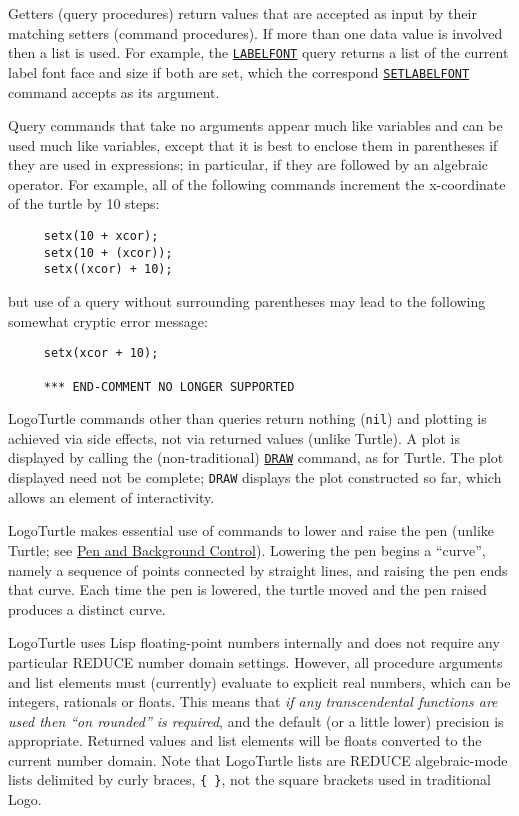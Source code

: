 Getters (query procedures) return values that are accepted as input by
their matching setters (command procedures).  If more than one data
value is involved then a list is used.  For example, the
\hyperref[logoturtle:labelfont]{\texttt{LABELFONT}} query returns a
list of the current label font face and size if both are set, which
the correspond
\hyperref[logoturtle:setlabelfont]{\texttt{SETLABELFONT}} command
accepts as its argument.

Query commands that take no arguments appear much like variables and
can be used much like variables, except that it is best to enclose
them in parentheses if they are used in expressions; in particular, if
they are followed by an algebraic operator.  For example, all of the
following commands increment the x-coordinate of the turtle by 10
steps:
\begin{verbatim}
     setx(10 + xcor);
     setx(10 + (xcor));
     setx((xcor) + 10);
\end{verbatim}
but use of a query without surrounding parentheses may lead to the
following somewhat cryptic error message:
\begin{verbatim}
     setx(xcor + 10);

     *** END-COMMENT NO LONGER SUPPORTED
\end{verbatim}

LogoTurtle commands other than queries return nothing (\texttt{nil})
and plotting is achieved via side effects, not via returned values
(unlike Turtle).  A plot is displayed by calling the (non-traditional)
\hyperref[logoturtle:draw]{\texttt{DRAW}} command, as for Turtle.  The
plot displayed need not be complete; \texttt{DRAW} displays the plot
constructed so far, which allows an element of interactivity.

LogoTurtle makes essential use of commands to lower and raise the pen
(unlike Turtle; see \hyperref[logoturtle:PBC]{Pen and Background
  Control}).  Lowering the pen begins a ``curve'', namely a sequence
of points connected by straight lines, and raising the pen ends that
curve.  Each time the pen is lowered, the turtle moved and the pen
raised produces a distinct curve.

LogoTurtle uses Lisp floating-point numbers internally and does not
require any particular REDUCE number domain settings.  However, all
procedure arguments and list elements must (currently) evaluate to
explicit real numbers, which can be integers, rationals or floats.
This means that \emph{if any transcendental functions are used then
``on rounded'' is required}, and the default (or a little lower)
precision is appropriate.  Returned values and list elements will be
floats converted to the current number domain.  Note that LogoTurtle
lists are REDUCE algebraic-mode lists delimited by curly braces,
\texttt{\{~\}}, not the square brackets used in traditional Logo.



